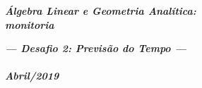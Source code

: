 \documentclass[pdftex, brazil, 12pt, oneside, addpoints]{exam}
\begin{document}
\begin{coverpages}

\begin{center}
\textbf{\textit{\Large%
Álgebra Linear e Geometria Analítica:\\
monitoria}}
\end{center}

\vspace{1cm}

\begin{figure}[H]
\begin{center}
\end{center}
\end{figure}

\vspace{1cm}

\begin{center}
\textit{\textbf{\Large%
--- Desafio 2: Previsão do Tempo ---\\
\ \\
Abril/2019}}
\end{center}



\end{coverpages}
\end{document}
